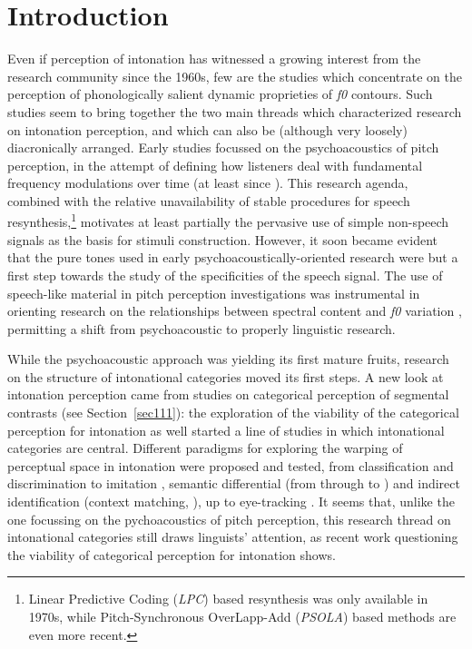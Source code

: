 \section{Introduction}\label{sec31}
Even if perception of intonation has witnessed a growing interest from the research community since the 1960s, few are the studies which concentrate on the perception of phonologically salient dynamic proprieties of \textit{f0} contours. Such studies seem to bring together the two main threads which characterized research on intonation perception, and which can also be (although very loosely) diacronically arranged. Early studies focussed on the psychoacoustics of pitch perception, in the attempt of defining how listeners deal with fundamental frequency modulations over time (at least since \citealt{sergeant1962sensitivity}). This research agenda, combined with the relative unavailability of stable procedures for speech resynthesis,\footnote{Linear Predictive Coding (\textit{LPC}) based resynthesis was only available in 1970s, while Pitch-Synchronous OverLapp-Add (\textit{PSOLA}) based methods are even more recent.} motivates at least partially the pervasive use of simple non-speech signals as the basis for stimuli construction. However, it soon became evident that the pure tones used in early psychoacoustically-oriented research were but a first step towards the study of the specificities of the speech signal. The use of speech-like material in pitch perception investigations \citep{rossi1971seuil,klatt1973discrimination,thart1976psychoacoustic,schouten1985identification} was instrumental in orienting research on the relationships between spectral content and \textit{f0} variation \citep{house1990tonal,house1997perceptual}, permitting a shift from psychoacoustic to properly linguistic research.

While the psychoacoustic approach was yielding its first mature fruits, research on the structure of intonational categories moved its first steps. A new look at intonation perception came from studies on categorical perception of segmental contrasts (see Section~\ref{sec111}): the exploration of the viability of the categorical perception \citep{kohler1987categorical} for intonation as well started a line of studies in which intonational categories are central. Different paradigms for exploring the warping of perceptual space in intonation were proposed and tested, from classification and discrimination to imitation \citep{pierrehumbert1989categories}, semantic differential (from  \citealt{osgood1957measurement} through \citealt{uldall1964dimensions} to \citealt{kirsner1994interaction}) and indirect identification (context matching, \citealt{nash1980intonation}), up to eye-tracking \citep{dahan2002accent}. It seems that, unlike the one focussing on the pychoacoustics of pitch perception, this research thread on intonational categories still draws linguists' attention, as recent work questioning the viability of categorical perception for intonation \citep{gussenhoven2006experimental,niebuhr2007categorical} shows.

